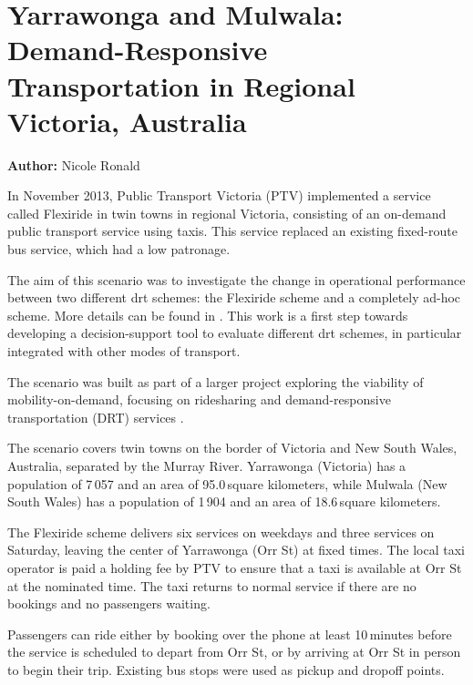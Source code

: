 \section{Yarrawonga and Mulwala: Demand-Responsive Transportation in Regional Victoria, Australia}
\label{sec:yarrawonga}
\hfill \textbf{Author:} Nicole Ronald

In November 2013, Public Transport Victoria (PTV) implemented a service called
Flexiride in twin towns in regional Victoria, consisting of an on-demand public
transport service using taxis. This service replaced an existing fixed-route bus
service, which had a low patronage.

The aim of this scenario was to investigate the change in operational
performance between two different \gls{drt} schemes: the Flexiride scheme and a
completely ad-hoc scheme. More details can be found in
\citep[][]{RonThoWin2015}. This work is a first step towards developing a
decision-support tool to evaluate different \gls{drt} schemes, in particular
integrated with other modes of transport. 

The scenario was built as part of a larger project exploring the viability of
mobility-on-demand, focusing on ridesharing and demand-responsive transportation
(DRT) services \citep[][]{Ronald_iMoD_2014}.

The scenario covers twin towns on the border of Victoria and New South Wales,
Australia, separated by the Murray River. Yarrawonga (Victoria) has a population
of 7\,057 and an area of 95.0\,square kilometers, while Mulwala (New South Wales) has a
population of 1\,904 and an area of 18.6\,square kilometers. 

The Flexiride scheme delivers six services on weekdays and three services on
Saturday, leaving the center of Yarrawonga (Orr St) at fixed times.  The local
taxi operator is paid a holding fee by PTV to ensure that a taxi is available at
Orr St at the nominated time. The taxi returns to normal service if there are no
bookings and no passengers waiting.

Passengers can ride either by booking over the phone at least 10\,minutes before
the service is scheduled to depart from Orr St, or by arriving at Orr St in
person to begin their trip. Existing bus stops were used as pickup and dropoff
points.

